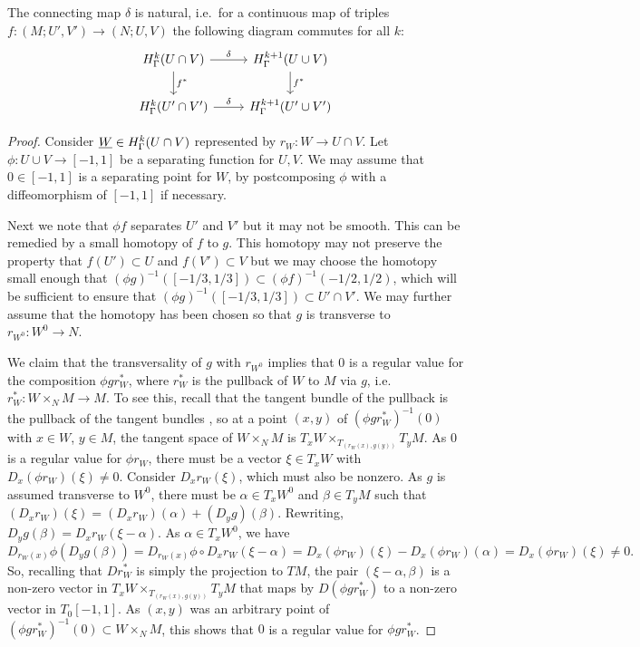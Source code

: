 \begin{lemma}\label{L: natural connection}
	The connecting map $\delta$ is natural, i.e.\ for a continuous map of triples $f \colon (M;U',V') \to (N;U,V)$ the following diagram commutes for all $k$:
	\[
	\begin{tikzcd}
		H^k_\Gamma(U \cap V) \arrow[r, "\delta"] \arrow[d, "f^*"] & H^{k+1}_\Gamma(U \cup V) \arrow[d, "f^*"] \\
		H^k_\Gamma(U' \cap V') \arrow[r, "\delta"] & H^{k+1}_\Gamma(U' \cup V')
	\end{tikzcd}
	\]
\end{lemma}

\begin{proof}
	Consider $\underline{W} \in H^k_\Gamma(U \cap V)$ represented by $r_W \colon W \to U \cap V$.
	Let $\phi \colon U \cup V \to [-1,1]$ be a separating function for $U,V$.
	We may assume that $0 \in [-1,1]$ is a separating point for $W$, by postcomposing $\phi$ with a diffeomorphism of $[-1,1]$ if necessary.

	Next we note that $\phi f$ separates $U'$ and $V'$ but it may not be smooth.
	This can be remedied by a small homotopy of $f$ to $g$.
	This homotopy may not preserve the property that $f(U') \subset U$ and $f(V') \subset V$ but we may choose the homotopy small enough that $(\phi g)^{-1}([-1/3,1/3]) \subset (\phi f)^{-1}(-1/2,1/2)$, which will be sufficient to ensure that $(\phi g)^{-1}([-1/3,1/3]) \subset U' \cap V'$.
	We may further assume that the homotopy has been chosen so that $g$ is transverse to $r_{W^0} \colon W^0 \to N$.

	We claim that the transversality of $g$ with $r_{W^0}$ implies that $0$ is a regular value for the composition $\phi gr_W^*$, where $r_W^*$ is the pullback of $W$ to $M$ via $g$, i.e.\ $r_W^*: W \times_N M \to M$.
	To see this, recall that the tangent bundle of the pullback is the pullback of the tangent bundles \cite[Theorem 5.47]{Wed16}, so at a point $(x,y)$ of $(\phi gr^*_{W})^{-1}(0)$ with $x \in W$, $y \in M$, the tangent space of $W \times_N M$ is $T_x W \times_{T_{( r_W(x),g(y))}} T_yM$.
	As $0$ is a regular value for $\phi r_W$, there must be a vector $\xi \in T_xW$ with $D_x(\phi r_W)(\xi)\neq 0$.
	Consider $D_xr_W(\xi)$, which must also be nonzero.
	As $g$ is assumed transverse to $W^0$, there must be $\alpha \in T_xW^0$ and $\beta \in T_yM$ such that $(D_xr_W)(\xi) = (D_xr_W)(\alpha) + (D_yg) (\beta)$.
	Rewriting, $D_yg (\beta) = D_xr_W(\xi-\alpha)$.
	As $\alpha \in T_xW^0$, we have $$D_{r_W(x)}\phi(D_yg (\beta)) = D_{r_W(x)}\phi \circ D_xr_W(\xi-\alpha) = D_x(\phi r_W)(\xi)-D_x(\phi r_W)(\alpha) = D_x(\phi r_W)(\xi)\neq 0.$$
	So, recalling that $Dr_W^*$ is simply the projection to $TM$, the pair $( \xi-\alpha, \beta)$ is a non-zero vector in $T_xW\times_{T_{( r_W(x), g(y))}}T_y M$ that maps by $D(\phi gr_W^*)$ to a non-zero vector in $T_{0}[-1,1]$.
	As $(x,y)$ was an arbitrary point of $(\phi gr^*_{W})^{-1}(0) \subset W \times_N M$, this shows that $0$ is a regular value for $\phi gr^*_W$.


\end{proof}

